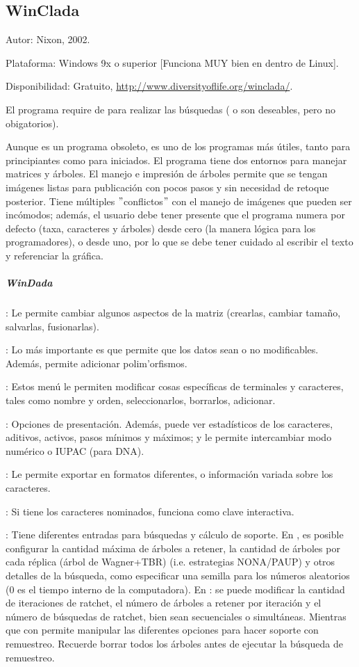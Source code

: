 \subsection{WinClada}
\noindent
Autor: Nixon, 2002.

Plataforma: Windows 9x o superior [Funciona MUY bien en  dentro de Linux].

Disponibilidad: Gratuito, 
\url{http://www.diversityoflife.org/winclada/}.

El programa require de  para realizar las b\'usquedas ( o  son deseables, pero no obigatorios).

Aunque es un programa obsoleto, es uno de los programas m\'as \'utiles, tanto para principiantes como para iniciados. El programa tiene dos entornos para manejar matrices y \'arboles. El manejo e impresi\'on de \'arboles permite que se tengan im\'agenes listas para publicaci\'on con pocos pasos y sin necesidad de retoque posterior. Tiene m\'ultiples $"$conflictos$"$ con el manejo de im\'agenes que pueden ser inc\'omodos; adem\'as, el usuario debe tener presente que el programa numera por defecto (taxa, caracteres y \'arboles) desde cero (la manera l\'ogica para los programadores), o desde uno, por lo que se debe tener cuidado al escribir el texto y referenciar la gr\'afica.

\subparagraph*{WinDada}
: Le permite cambiar algunos aspectos de la matriz (crearlas, cambiar tama\~no, salvarlas, fusionarlas).

: Lo m\'as importante es que permite que los datos sean o no modificables. Adem\'as, permite adicionar polim'orfismos.

: Estos men\'u le permiten modificar cosas espec\'ificas de terminales y caracteres, tales como nombre y orden, seleccionarlos, borrarlos, adicionar.

: Opciones de presentaci\'on. Adem\'as, puede ver estad\'isticos de los caracteres, aditivos, activos, pasos m\'inimos y m\'aximos; y le permite intercambiar modo num\'erico o IUPAC (para DNA).

: Le permite exportar en formatos diferentes, o informaci\'on variada sobre los caracteres.

: Si tiene los caracteres nominados, funciona como clave interactiva.

: Tiene diferentes entradas para b\'usquedas y c\'alculo de soporte. En , es posible configurar la cantidad m\'axima de \'arboles a retener, la cantidad de \'arboles por cada r\'eplica (\'arbol de Wagner+TBR) (i.e. estrategias NONA/PAUP) y otros detalles de la b\'usqueda, como especificar una semilla para los n\'umeros aleatorios (0 es el tiempo interno de la computadora). En : se puede modificar la cantidad de iteraciones de ratchet, el n\'umero de \'arboles a retener por iteraci\'on y el n\'umero de b\'usquedas de ratchet, bien sean secuenciales o simult\'aneas. Mientras que con  permite manipular las diferentes opciones para hacer soporte con remuestreo. Recuerde borrar todos los \'arboles antes de ejecutar la b\'usqueda de remuestreo.

